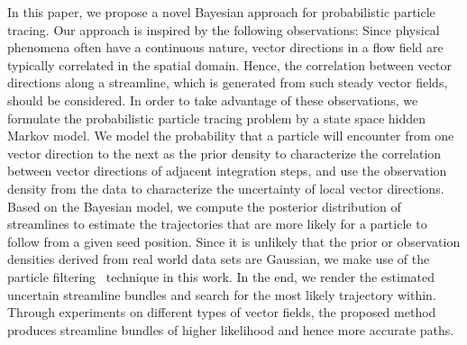 \documentclass{vgtc}                          %
\begin{document}
In this paper, we propose a novel Bayesian approach for probabilistic particle tracing. Our approach is inspired by the following observations: Since physical phenomena often have a continuous nature, vector directions in a flow field are typically correlated in the spatial domain. Hence, the correlation between vector directions along a streamline, which is generated from such steady vector fields, should be considered. In order to take advantage of these observations, we formulate the probabilistic particle tracing problem by a state space hidden Markov model. We model the probability that a particle will encounter from one vector direction to the next as the prior density to characterize the correlation between vector directions of adjacent integration steps, and use the observation density from the data to characterize the uncertainty of local vector directions. Based on the Bayesian model, we compute the posterior distribution of streamlines to estimate the trajectories that are more likely for a particle to follow from a given seed position. Since it is unlikely that the prior or observation densities derived from real world data sets are Gaussian, we make use of the particle filtering~\cite{doucet2001sequential} technique in this work. In the end, we render the estimated uncertain streamline bundles and search for the most likely trajectory within. Through experiments on different types of vector fields, the proposed method produces streamline bundles of higher likelihood and hence more accurate paths.













\end{document}
